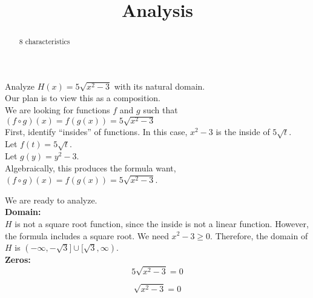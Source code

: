 \documentclass{ximera}
\title{Analysis}
\begin{document}
\begin{abstract}
8 characteristics
\end{abstract}
\maketitle












Analyze $H(x) = 5 \sqrt{x^2-3}$ with its natural domain. \\

Our plan is to view this as a composition. \\






We are looking for functions $f$ and $g$ such that $(f \circ g)(x) = f(g(x)) = 5 \sqrt{x^2-3}$ \\


First, identify ``insides'' of functions.  In this case, $x^2 - 3$ is the inside of $5 \sqrt{t}$. \\




Let $f(t) = 5 \sqrt{t}$. \\

Let $g(y) = y^2 - 3$. \\


Algebraically, this produces the formula want, $(f \circ g)(x) = f(g(x)) = 5 \sqrt{x^2-3}$.



We are ready to analyze. \\




\textbf{\textcolor{blue!55!black}{Domain:}} \\


$H$ is not a square root function, since the inside is not a linear function.  However, the formula includes a square root. We need $x^2-3 \geq 0$.  Therefore, the domain of $H$ is $(-\infty, -\sqrt{3}] \cup [\sqrt{3}, \infty)$. \\



\textbf{\textcolor{blue!55!black}{Zeros:}} \\




\[
5 \sqrt{x^2-3} = 0
\]


\[
\sqrt{x^2-3} = 0
\]
\end{document}
